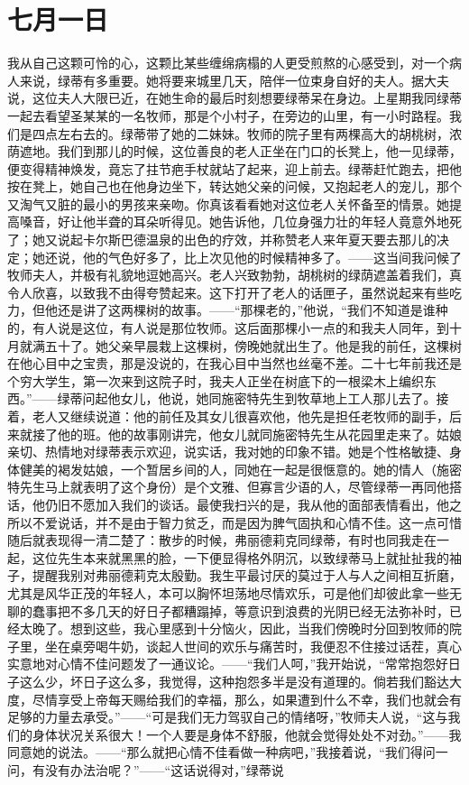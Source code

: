 \documentclass[12pt,oneside]{book}
\begin{document}
\chapter{七月一日}
\label{sec-2-15}
我从自己这颗可怜的心，这颗比某些缠绵病榻的人更受煎熬的心感受到，对一个病人来说，绿蒂有多重要。她将要来城里几天，陪伴一位束身自好的夫人。据大夫说，这位夫人大限已近，在她生命的最后时刻想要绿蒂呆在身边。上星期我同绿蒂一起去看望圣某某的一名牧师，那是个小村子，在旁边的山里，有一小时路程。我们是四点左右去的。绿蒂带了她的二妹妹。牧师的院子里有两棵高大的胡桃树，浓荫遮地。我们到那儿的时候，这位善良的老人正坐在门口的长凳上，他一见绿蒂，便变得精神焕发，竟忘了拄节疤手杖就站了起来，迎上前去。绿蒂赶忙跑去，把他按在凳上，她自己也在他身边坐下，转达她父亲的问候，又抱起老人的宠儿，那个又淘气又脏的最小的男孩来亲吻。你真该看看她对这位老人关怀备至的情景。她提高嗓音，好让他半聋的耳朵听得见。她告诉他，几位身强力壮的年轻人竟意外地死了；她又说起卡尔斯巴德温泉的出色的疗效，并称赞老人来年夏天要去那儿的决定；她还说，他的气色好多了，比上次见他的时候精神多了。——这当间我问候了牧师夫人，并极有礼貌地逗她高兴。老人兴致勃勃，胡桃树的绿荫遮盖着我们，真令人欣喜，以致我不由得夸赞起来。这下打开了老人的话匣子，虽然说起来有些吃力，但他还是讲了这两棵树的故事。——“那棵老的，”他说，“我们不知道是谁种的，有人说是这位，有人说是那位牧师。这后面那棵小一点的和我夫人同年，到十月就满五十了。她父亲早晨栽上这棵树，傍晚她就出生了。他是我的前任，这棵树在他心目中之宝贵，那是没说的，在我心目中当然也丝毫不差。二十七年前我还是个穷大学生，第一次来到这院子时，我夫人正坐在树底下的一根梁木上编织东西。”——绿蒂问起他女儿，他说，她同施密特先生到牧草地上工人那儿去了。接着，老人又继续说道：他的前任及其女儿很喜欢他，他先是担任老牧师的副手，后来就接了他的班。他的故事刚讲完，他女儿就同施密特先生从花园里走来了。姑娘亲切、热情地对绿蒂表示欢迎，说实话，我对她的印象不错。她是个性格敏捷、身体健美的褐发姑娘，一个暂居乡间的人，同她在一起是很惬意的。她的情人（施密特先生马上就表明了这个身份）是个文雅、但寡言少语的人，尽管绿蒂一再同他搭话，他仍旧不愿加入我们的谈话。最使我扫兴的是，我从他的面部表情看出，他之所以不爱说话，并不是由于智力贫乏，而是因为脾气固执和心情不佳。这一点可惜随后就表现得一清二楚了：散步的时候，弗丽德莉克同绿蒂，有时也同我走在一起，这位先生本来就黑黑的脸，一下便显得格外阴沉，以致绿蒂马上就扯扯我的袖子，提醒我别对弗丽德莉克太殷勤。我生平最讨厌的莫过于人与人之间相互折磨，尤其是风华正茂的年轻人，本可以胸怀坦荡地尽情欢乐，可是他们却彼此拿一些无聊的蠢事把不多几天的好日子都糟蹋掉，等意识到浪费的光阴已经无法弥补时，已经太晚了。想到这些，我心里感到十分恼火，因此，当我们傍晚时分回到牧师的院子里，坐在桌旁喝牛奶，谈起人世间的欢乐与痛苦时，我便忍不住接过话茬，真心实意地对心情不佳问题发了一通议论。——“我们人呵，”我开始说，“常常抱怨好日子这么少，坏日子这么多，我觉得，这种抱怨多半是没有道理的。倘若我们豁达大度，尽情享受上帝每天赐给我们的幸福，那么，如果遭到什么不幸，我们也就会有足够的力量去承受。”——“可是我们无力驾驭自己的情绪呀，”牧师夫人说，“这与我们的身体状况关系很大！一个人要是身体不舒服，他就会觉得处处不对劲。”——我同意她的说法。——“那么就把心情不佳看做一种病吧，”我接着说，“我们得问一问，有没有办法治呢？”——“这话说得对，”绿蒂说
\end{document}
